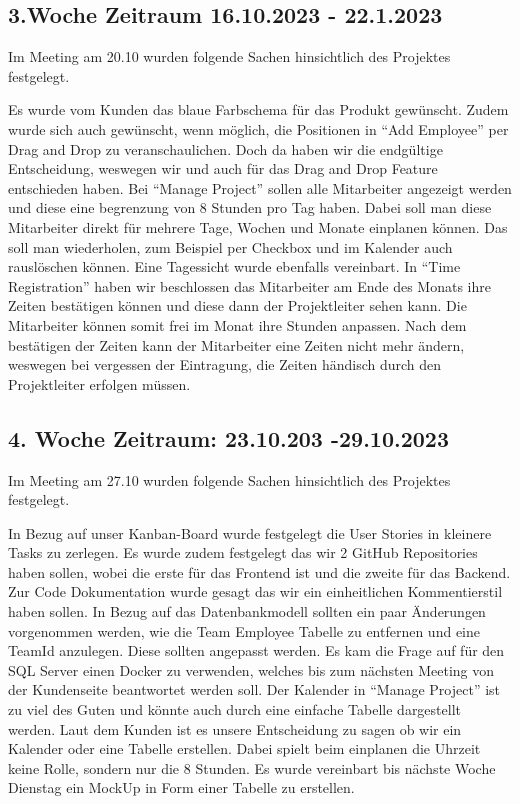 \documentclass{article}
\begin{document}
\subsection{3.Woche Zeitraum 16.10.2023 - 22.1.2023}
Im Meeting am 20.10 wurden folgende Sachen hinsichtlich des Projektes
festgelegt.

Es wurde vom Kunden das blaue Farbschema für das Produkt gewünscht. Zudem wurde
sich auch gewünscht, wenn möglich, die Positionen in “Add Employee” per Drag
and Drop zu veranschaulichen. Doch da haben wir die endgültige Entscheidung,
weswegen wir und auch für das Drag and Drop Feature entschieden haben. Bei
“Manage Project” sollen alle Mitarbeiter angezeigt werden und diese eine
begrenzung von 8 Stunden pro Tag haben. Dabei soll man diese Mitarbeiter direkt
für mehrere Tage, Wochen und Monate einplanen können. Das soll man wiederholen,
zum Beispiel per Checkbox und im Kalender auch rauslöschen können. Eine
Tagessicht wurde ebenfalls vereinbart. In “Time Registration” haben wir
beschlossen das Mitarbeiter am Ende des Monats ihre Zeiten bestätigen können
und diese dann der Projektleiter sehen kann. Die Mitarbeiter können somit frei
im Monat ihre Stunden anpassen. Nach dem bestätigen der Zeiten kann der
Mitarbeiter eine Zeiten nicht mehr ändern, weswegen bei vergessen der
Eintragung, die Zeiten händisch durch den Projektleiter erfolgen müssen.

\subsection{4. Woche Zeitraum: 23.10.203 -29.10.2023}
Im Meeting am 27.10 wurden folgende Sachen hinsichtlich des Projektes
festgelegt.

In Bezug auf unser Kanban-Board wurde festgelegt die User Stories in kleinere
Tasks zu zerlegen. Es wurde zudem festgelegt das wir 2 GitHub Repositories
haben sollen, wobei die erste für das Frontend ist und die zweite für das
Backend. Zur Code Dokumentation wurde gesagt das wir ein einheitlichen
Kommentierstil haben sollen. In Bezug auf das Datenbankmodell sollten ein paar
Änderungen vorgenommen werden, wie die Team Employee Tabelle zu entfernen und
eine TeamId anzulegen. Diese sollten angepasst werden. Es kam die Frage auf für
den SQL Server einen Docker zu verwenden, welches bis zum nächsten Meeting von
der Kundenseite beantwortet werden soll. Der Kalender in “Manage Project” ist
zu viel des Guten und könnte auch durch eine einfache Tabelle dargestellt
werden. Laut dem Kunden ist es unsere Entscheidung zu sagen ob wir ein Kalender
oder eine Tabelle erstellen. Dabei spielt beim einplanen die Uhrzeit keine
Rolle, sondern nur die 8 Stunden. Es wurde vereinbart bis nächste Woche
Dienstag ein MockUp in Form einer Tabelle zu erstellen.
\end{document}
